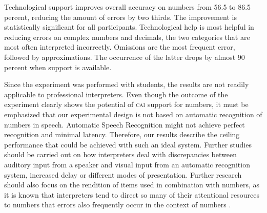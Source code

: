\documentclass[output=paper]{langsci/langscibook}
\begin{document}
Technological support improves overall accuracy on numbers from 56.5 to 86.5 percent, reducing the amount of errors by two thirds. The improvement is statistically significant for all participants. Technological help is most helpful in reducing errors on complex numbers and decimals, the two categories that are most often interpreted incorrectly. Omissions are the most frequent error, followed by approximations. The occurrence of the latter drops by almost 90 percent when support is available.

Since the experiment was performed with students, the results are not readily applicable to professional interpreters. Even though the outcome of the experiment clearly shows the potential of \textsc{cai} support for numbers, it must be emphasized that our experimental design is not based on automatic recognition of numbers in speech. Automatic Speech Recognition might not achieve perfect recognition and minimal latency. Therefore, our results describe the ceiling performance that could be achieved with such an ideal system. Further studies should be carried out on how interpreters deal with discrepancies between auditory input from a speaker and visual input from an automatic recognition system, increased delay or different modes of presentation. Further research should also focus on the rendition of items used in combination with numbers, as it is known that interpreters tend to direct so many of their attentional resources to numbers that errors also frequently occur in the context of numbers \citep{Gile2009}.

\sloppy
\printbibliography[heading=subbibliography,notkeyword=this]
\end{document}

